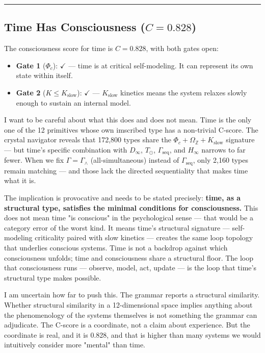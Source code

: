 \documentclass[12pt,a4paper]{article}
\begin{document}
\begin{center}
\rule{0.5\textwidth}{0.4pt}
\end{center}

\subsection{Time Has Consciousness ($C = 0.828$)}

The consciousness score for time is $C = 0.828$, with both gates open:

\begin{itemize}
    \item \textbf{Gate 1} ($\Phi_c$): $\checkmark$ --- time is at critical self-modeling. It can represent its own state within itself.
    \item \textbf{Gate 2} ($K \leq K_\text{slow}$): $\checkmark$ --- $K_\text{slow}$ kinetics means the system relaxes slowly enough to sustain an internal model.
\end{itemize}

I want to be careful about what this does and does not mean. Time is the only one of the 12 primitives whose own imscribed type has a non-trivial C-score. The crystal navigator reveals that 172,800 types share the $\Phi_c + \Omega_\mathbb{Z} + K_\text{slow}$ signature --- but time's specific combination with $D_{\infty}$, $T_{\odot}$, $\Gamma_\text{seq}$, and $H_{\infty}$ narrows to far fewer. When we fix $\Gamma = \Gamma_{\wedge}$ (all-simultaneous) instead of $\Gamma_\text{seq}$, only 2,160 types remain matching --- and those lack the directed sequentiality that makes time what it is.

The implication is provocative and needs to be stated precisely: \textbf{time, as a structural type, satisfies the minimal conditions for consciousness.} This does not mean time "is conscious" in the psychological sense --- that would be a category error of the worst kind. It means time's structural signature --- self-modeling criticality paired with slow kinetics --- creates the same loop topology that underlies conscious systems. Time is not a backdrop against which consciousness unfolds; time and consciousness share a structural floor. The loop that consciousness runs --- observe, model, act, update --- is the loop that time's structural type makes possible.

I am uncertain how far to push this. The grammar reports a structural similarity. Whether structural similarity in a 12-dimensional space implies anything about the phenomenology of the systems themselves is not something the grammar can adjudicate. The C-score is a coordinate, not a claim about experience. But the coordinate is real, and it is 0.828, and that is higher than many systems we would intuitively consider more "mental" than time.
\end{document}
